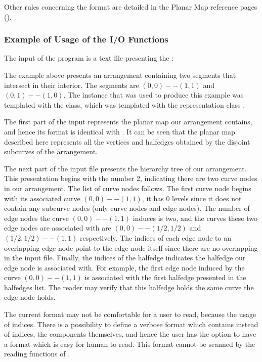 \begin{itemize}
\begin{ccAdvanced}
Other rules concerning the format are detailed in the Planar Map 
reference pages ().

\subsubsection{Example of Usage of the I/O Functions}
\label{ARR_sec:example11}

The input of the program is a text file presenting the :

The example above presents an arrangement containing two segments that 
intersect in their interior. The segments are $(0,0) -- (1,1)$ and $(0,1) --
(1,0)$.  The  instance that was used to produce this example 
was templated  with the  class, which was 
templated with the representation class .

The first part of the input represents the planar map our arrangement 
contains, and hence its format is identical with . 
It can be seen that the planar map described here represents all the vertices 
and halfedges obtained by the disjoint subcurves of the arrangement.

The next part of the input file presents the hierarchy tree of our 
arrangement. This presentation begins with the number 2, indicating there are 
two curve nodes in our arrangement. The list of curve nodes follows.
The first curve node begins with its associated curve $(0,0) -- (1,1)$, 
it has 0 levels since it does not contain any subcurve nodes (only curve 
nodes and edge nodes). 
The number of edge nodes the curve $(0,0) -- (1,1)$ induces is two, 
and the curves these two edge nodes are associated with are 
$(0,0) -- (1/2,1/2)$ and $(1/2,1/2) -- (1,1)$ respectively. 
The indices of each edge node to an overlapping edge node point to the edge 
node itself since there are no overlapping in the input file. 
Finally, the indices of the halfedge indicates the halfedge our edge node is 
associated with. 
For example, the first edge node induced by the curve $(0,0) -- (1,1)$ is 
associated  with the first halfedge presented in the halfedges list. The 
reader may verify that this halfedge holds the same curve the edge node holds.

The current format may not be comfortable for a user to read, because the 
usage of indices. There is a possibility to define a verbose format which 
contains instead of indices, the components themselves, and hence the user 
has the option to have a format which is easy for human to read.
This format cannot be scanned by the reading functions of .


\end{ccAdvanced}
\end{itemize}

